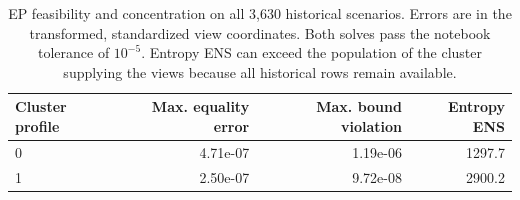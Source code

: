\begin{table}[htbp]
\centering
\small
\begin{tabularx}{\textwidth}{@{}Xrrr@{}}
\toprule
Cluster profile & Max. equality error & Max. bound violation & Entropy ENS\\
\midrule
0 & 4.71e-07 & 1.19e-06 & 1297.7\\
1 & 2.50e-07 & 9.72e-08 & 2900.2\\
\bottomrule
\end{tabularx}
\caption{EP feasibility and concentration on all 3,630 historical scenarios. Errors are in the transformed, standardized view coordinates. Both solves pass the notebook tolerance of $10^{-5}$. Entropy ENS can exceed the population of the cluster supplying the views because all historical rows remain available.}
\label{tab:fixed11-ep-diagnostics}
\end{table}
